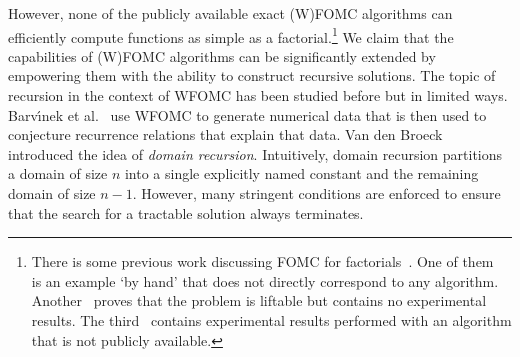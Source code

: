 \documentclass{article}
\theoremstyle{definition}
\theoremstyle{remark}
\begin{document}
However, none of the publicly available exact (W)FOMC algorithms can efficiently
compute functions as simple as a factorial.\footnote{There is some previous work
  discussing FOMC for
  factorials~\cite{DBLP:journals/jair/Kuzelka21,DBLP:conf/kr/BremenK21,DBLP:conf/ijcai/Broeck16}.
  One of them~\cite{DBLP:conf/ijcai/Broeck16} is an example `by hand' that does
  not directly correspond to any algorithm.
  Another~\cite{DBLP:journals/jair/Kuzelka21} proves that the problem is
  liftable but contains no experimental results. The
  third~\cite{DBLP:conf/kr/BremenK21} contains experimental results performed
  with an algorithm that is not publicly available.} We claim that the
capabilities of (W)FOMC algorithms can be significantly extended by empowering
them with the ability to construct recursive solutions. The topic of recursion
in the context of WFOMC has been studied before but in limited ways.
Barv{\'{\i}}nek et al.~ use WFOMC to
generate numerical data that is then used to conjecture recurrence relations
that explain that data. Van den Broeck~
introduced the idea of \emph{domain recursion}. Intuitively, domain recursion
partitions a domain of size $n$ into a single explicitly named constant and the
remaining domain of size $n-1$. However, many stringent conditions are enforced
to ensure that the search for a tractable solution always terminates.


\end{document}
